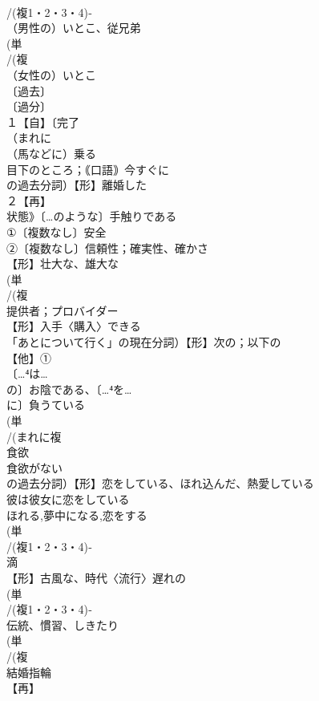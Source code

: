 \documentclass[8pt]{extreport}
\begin{document}
\begin{CJK}{UTF8}{min}
\\	/(複1・2・3・4)‐
\\	（男性の）いとこ、従兄弟 
\\	(単
\\	/(複
\\	（女性の）いとこ 
\\	〔過去〕
\\	〔過分〕
\\	１【自】〔完了
\\	（まれに
\\	（馬などに）乗る 
\\	目下のところ；｟口語｠今すぐに
\\	の過去分詞）【形】離婚した 
\\	２【再】
\\	状態》〔…のような〕手触りである 
\\	①〔複数なし〕安全 
\\	②〔複数なし〕信頼性；確実性、確かさ
\\	【形】壮大な、雄大な 
\\	(単
\\	/(複
\\	提供者；プロバイダー 
\\	【形】入手〈購入〉できる 
\\	「あとについて行く」の現在分詞）【形】次の；以下の 
\\	【他】①
\\	〔…⁴は…
\\	の〕お陰である、〔…⁴を…
\\	に〕負うている 
\\	(単
\\	/(まれに複
\\	食欲 
\\	食欲がない
\\	の過去分詞）【形】恋をしている、ほれ込んだ、熱愛している 
\\	彼は彼女に恋をしている 
\\	ほれる,夢中になる,恋をする
\\	(単
\\	/(複1・2・3・4)‐　
\\	滴 
\\	【形】古風な、時代〈流行〉遅れの 
\\	(単
\\	/(複1・2・3・4)‐
\\	伝統、慣習、しきたり
\\	(単
\\	/(複
\\	結婚指輪 
\\	【再】

\end{CJK}
\end{document}
